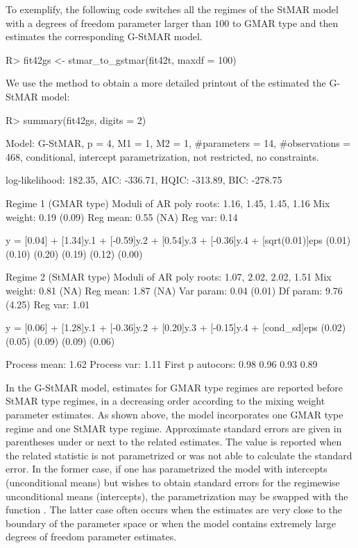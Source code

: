 \documentclass[nojss]{jss} %
\begin{document}
To exemplify, the following code switches all the regimes of the StMAR model  with a degrees of freedom parameter larger than $100$ to GMAR type and then estimates the corresponding G-StMAR model.
%
\begin{CodeChunk}
\begin{CodeInput}
R> fit42gs <- stmar_to_gstmar(fit42t, maxdf = 100)
\end{CodeInput}
\end{CodeChunk}
%
We use the  method to obtain a more detailed printout of the estimated the G-StMAR model:
%
\begin{CodeChunk}
\begin{CodeInput}
R> summary(fit42gs, digits = 2)
\end{CodeInput}
\begin{CodeOutput}
Model:
 G-StMAR, p = 4, M1 = 1, M2 = 1, #parameters = 14, #observations = 468,
 conditional, intercept parametrization, not restricted, no constraints.

 log-likelihood: 182.35, AIC: -336.71, HQIC: -313.89, BIC: -278.75

Regime 1 (GMAR type)
Moduli of AR poly roots: 1.16, 1.45, 1.45, 1.16
Mix weight: 0.19 (0.09)
Reg mean: 0.55 (NA)
Reg var:  0.14

y = [0.04] + [1.34]y.1 + [-0.59]y.2 + [0.54]y.3 + [-0.36]y.4 + [sqrt(0.01)]eps
    (0.01)   (0.10)       (0.20)      (0.19)       (0.12)           (0.00)

Regime 2 (StMAR type)
Moduli of AR poly roots: 1.07, 2.02, 2.02, 1.51
Mix weight: 0.81 (NA)
Reg mean: 1.87 (NA)
Var param: 0.04 (0.01)
Df param: 9.76 (4.25)
Reg var:  1.01

y = [0.06] + [1.28]y.1 + [-0.36]y.2 + [0.20]y.3 + [-0.15]y.4 + [cond_sd]eps
    (0.02)   (0.05)       (0.09)      (0.09)       (0.06)

Process mean: 1.62
Process var:  1.11
First p autocors: 0.98 0.96 0.93 0.89
\end{CodeOutput}
\end{CodeChunk}
%
In the G-StMAR model, estimates for GMAR type regimes are reported before StMAR type regimes, in a decreasing order according to the mixing weight parameter estimates. As shown above, the model  incorporates one GMAR type regime and one StMAR type regime. Approximate standard errors are given in parentheses under or next to the related estimates. The value  is reported when the related statistic is not parametrized or  was not able to calculate the standard error. In the former case, if one has parametrized the model with intercepts (unconditional means) but wishes to obtain standard errors for the regimewise unconditional means (intercepts), the parametrization may be swapped with the function . The latter case often occurs when the estimates are very close to the boundary of the parameter space or when the model contains extremely large degrees of freedom parameter estimates.
\end{document}
